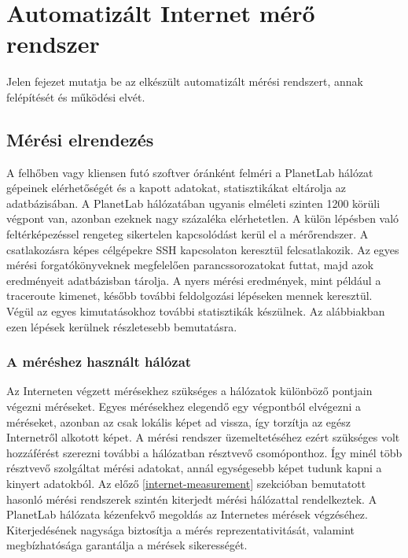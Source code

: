 \chapter{Automatizált Internet mérő rendszer}

Jelen fejezet mutatja be az elkészült automatizált mérési rendszert, annak felépítését és működési elvét.

\section{Mérési elrendezés}

A felhőben vagy kliensen futó szoftver óránként felméri a PlanetLab hálózat gépeinek elérhetőségét és a kapott adatokat, statisztikákat eltárolja az adatbázisában. A PlanetLab hálózatában ugyanis elméleti szinten 1200 körüli végpont van, azonban ezeknek nagy százaléka elérhetetlen. A külön lépésben való feltérképezéssel rengeteg sikertelen kapcsolódást kerül el a mérőrendszer. A csatlakozásra képes célgépekre SSH kapcsolaton keresztül felcsatlakozik. Az egyes mérési forgatókönyveknek megfelelően parancssorozatokat futtat, majd azok eredményeit adatbázisban tárolja.
A nyers mérési eredmények, mint például a traceroute kimenet, később további feldolgozási lépéseken mennek keresztül. Végül az egyes kimutatásokhoz további statisztikák készülnek.
Az alábbiakban ezen lépések kerülnek részletesebb bemutatásra.

\subsection{A méréshez használt hálózat}

Az Interneten végzett mérésekhez szükséges a hálózatok különböző pontjain végezni méréseket. Egyes mérésekhez elegendő egy végpontból elvégezni a méréseket, azonban az csak lokális képet ad vissza, így torzítja az egész Internetről alkotott képet. A mérési rendszer üzemeltetéséhez ezért szükséges volt hozzáférést szerezni további a hálózatban résztvevő csomóponthoz. Így minél több résztvevő szolgáltat mérési adatokat, annál egységesebb képet tudunk kapni a kinyert adatokból. Az előző \ref{internet-measurement} szekcióban bemutatott hasonló mérési rendszerek szintén kiterjedt mérési hálózattal rendelkeztek. A PlanetLab hálózata kézenfekvő megoldás az Internetes mérések végzéséhez. Kiterjedésének nagysága biztosítja a mérés reprezentativitását, valamint megbízhatósága garantálja a mérések sikerességét.

